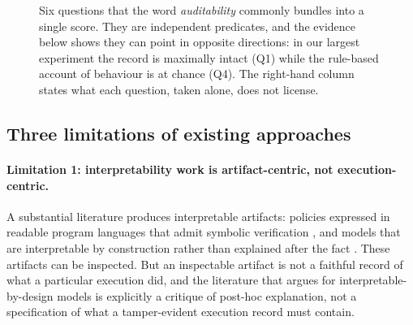 \documentclass[11pt,a4paper]{article}
\begin{document}
\begin{figure}[t]
\centering
{}
\caption{Six questions that the word \emph{auditability} commonly bundles into a single score. They are independent predicates, and the evidence below shows they can point in opposite directions: in our largest experiment the record is maximally intact (Q1) while the rule-based account of behaviour is at chance (Q4). The right-hand column states what each question, taken alone, does not license.}
\label{fig:questions}
\end{figure}

\subsection{Three limitations of existing approaches}
\label{sec:intro-limits}

\paragraph{Limitation 1: interpretability work is artifact-centric, not execution-centric.}
A substantial literature produces interpretable artifacts: policies expressed in readable program languages that admit symbolic verification \citep{verma2018}, and models that are interpretable by construction rather than explained after the fact \citep{rudin2019,lipton2018}. These artifacts can be inspected. But an inspectable artifact is not a faithful record of what a particular execution did, and the literature that argues for interpretable-by-design models is explicitly a critique of post-hoc explanation, not a specification of what a tamper-evident execution record must contain.
\end{document}
